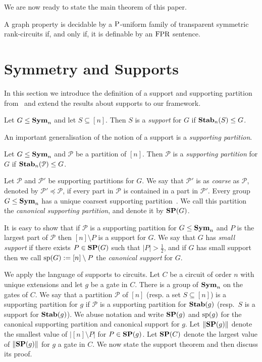 \documentclass[a4paper,UKenglish]{lipics-v2018}
\begin{document}
We are now ready to state the main theorem of this paper.

\begin{theorem}
  A graph property is decidable by a $\mathrm{P}$-uniform family of transparent
  symmetric rank-circuits if, and only if, it is definable by an $\text{\upshape FPR}$
  sentence.
\end{theorem}


\section{Symmetry and Supports}
In this section we introduce the definition of a support and supporting
partition from~\cite{AndersonD17} and extend the results about supports to our
framework.

\begin{definition}
  Let $G \leq \text{\textbf{Sym}}_n$ and let $S \subseteq [n]$. Then $S$ is a \emph{support}
  for $G$ if $\text{\textbf{Stab}}_n(S) \leq G$.
\end{definition}

An important generalisation of the notion of a support is a \emph{supporting
  partition}.

\begin{definition}
  Let $G \leq \text{\textbf{Sym}}_n$ and $\mathcal{P}$ be a partition of $[n]$. Then
  $\mathcal{P}$ is a \emph{supporting partition} for $G$ if
  $\text{\textbf{Stab}}_n(\mathcal{P}) \leq G$.
\end{definition}

Let $\mathcal{P}$ and $\mathcal{P}'$ be supporting partitions for $G$. We say
that $\mathcal{P}'$ is as \emph{coarse} as $\mathcal{P}$, denoted by
$\mathcal{P}' \preceq \mathcal{P}$, if every part in $\mathcal{P}$ is contained
in a part in $\mathcal{P}'$. Every group $G \leq \text{\textbf{Sym}}_n$ has a unique coarsest
supporting partition~\cite{AndersonD17}. We call this partition the
\emph{canonical supporting partition}, and denote it by $\text{\textbf{SP}} (G)$.

It is easy to show that if $\mathcal{P}$ is a supporting partition for $G \leq
\text{\textbf{Sym}}_n$ and $P$ is the largest part of $\mathcal{P}$ then $[n] \setminus P$ is a
support for $G$. We say that $G$ has \emph{small support} if there exists $P \in
\text{\textbf{SP}}(G)$ such that $\vert P \vert > \frac{1}{2}$, and if $G$ has small support
then we call $\text{sp}(G) := [n] \setminus P$ the \emph{canonical support} for
$G$.

We apply the language of supports to circuits. Let $C$ be a circuit of order $n$
with unique extensions and let $g$ be a gate in $C$. There is a group of
$\text{\textbf{Sym}}_n$ on the gates of $C$. We say that a partition $\mathcal{P}$ of $[n]$
(resp. a set $S \subseteq [n]$) is a supporting partition for $g$ if
$\mathcal{P}$ is a supporting partition for $\text{\textbf{Stab}}(g)$ (resp.\ $S$ is a support
for $\text{\textbf{Stab}}(g)$). We abuse notation and write $\text{\textbf{SP}}(g)$ and $\text{sp}(g)$ for the
canonical supporting partition and canonical support for $g$. Let $\| \text{\textbf{SP}}(g) \|$
denote the smallest value of $\vert [n] \setminus P \vert$ for $P \in \text{\textbf{SP}}(g)$. Let $\text{\textbf{SP}}(C)$
denote the largest value of $\| \text{\textbf{SP}}(g) \|$ for $g$ a gate in $C$. We now state
the support theorem and then discuss its proof.
\end{document}
